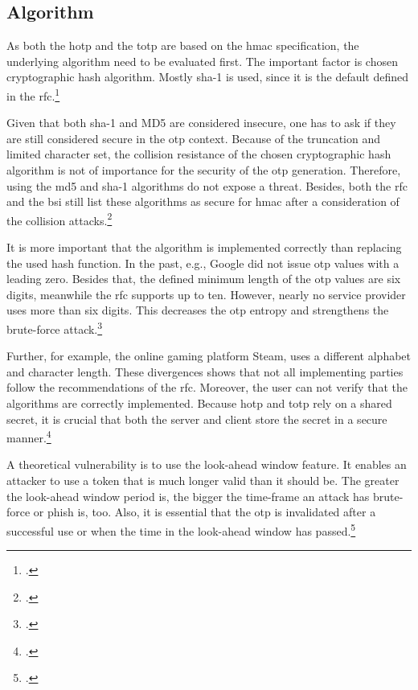 \subsection{Algorithm}

As both the \gls{hotp} and the \gls{totp} are based on the \gls{hmac} specification, the underlying algorithm need to be evaluated first. The important factor is chosen cryptographic hash algorithm. Mostly \gls{sha}-1 is used, since it is the default defined in the \gls{rfc}.\footcite[See][3]{m2011rfc}

Given that both \gls{sha}-1 and MD5 are considered insecure, one has to ask if they are still considered secure in the \gls{otp} context. Because of the truncation and limited character set, the collision resistance of the chosen cryptographic hash algorithm is not of importance for the security of the \gls{otp} generation. Therefore, using the \gls{md}5 and \gls{sha}-1 algorithms do not expose a threat. Besides, both the \gls{rfc} and the \gls{bsi} still list these algorithms as secure for \gls{hmac} after a consideration of the collision attacks.\footcites[See][]{10.1007/978-3-319-63688-7_19}[See][18]{bsi2019recommendations}[See][2]{s2011rfc}[See][395]{eckert-it-sec-9}

It is more important that the algorithm is implemented correctly than replacing the used hash function. In the past, e.g., Google did not issue \gls{otp} values with a leading zero. Besides that, the defined minimum length of the \gls{otp} values are six digits, meanwhile the \gls{rfc} supports up to ten. However, nearly no service provider uses more than six digits. This decreases the \gls{otp} entropy and strengthens the brute-force attack.\footcites[See][369]{10.1007/978-3-662-45472-5_24}

Further, for example, the online gaming platform Steam, uses a different alphabet and character length. These divergences shows that not all implementing parties follow the recommendations of the \gls{rfc}. Moreover, the user can not verify that the algorithms are correctly implemented. Because \gls{hotp} and \gls{totp} rely on a shared secret, it is crucial that both the server and client store the secret in a secure manner.\footcites[See][6--7]{steam-totp}[See][11--13]{m2005rfc}

A theoretical vulnerability is to use the look-ahead window feature. It enables an attacker to use a token that is much longer valid than it should be. The greater the look-ahead window period is, the bigger the time-frame an attack has brute-force or phish is, too. Also, it is essential that the \gls{otp} is invalidated after a successful use or when the time in the look-ahead window has passed.\footcites[See][369]{10.1007/978-3-662-45472-5_24}[See][11]{m2005rfc}

